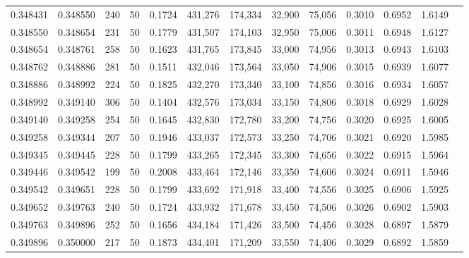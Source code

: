 \begin{tabular}{rrrrrrrrrrrrr}
0.348431 & 0.348550 &   240 &  50 &                                     0.1724 & 431,276 & 174,334 &  32,900 &  75,056 & 0.3010 & 0.6952 & 1.6149 \\
0.348550 & 0.348654 &   231 &  50 &                                     0.1779 & 431,507 & 174,103 &  32,950 &  75,006 & 0.3011 & 0.6948 & 1.6127 \\
0.348654 & 0.348761 &   258 &  50 &                                     0.1623 & 431,765 & 173,845 &  33,000 &  74,956 & 0.3013 & 0.6943 & 1.6103 \\
0.348762 & 0.348886 &   281 &  50 &                                     0.1511 & 432,046 & 173,564 &  33,050 &  74,906 & 0.3015 & 0.6939 & 1.6077 \\
0.348886 & 0.348992 &   224 &  50 &                                     0.1825 & 432,270 & 173,340 &  33,100 &  74,856 & 0.3016 & 0.6934 & 1.6057 \\
0.348992 & 0.349140 &   306 &  50 &                                     0.1404 & 432,576 & 173,034 &  33,150 &  74,806 & 0.3018 & 0.6929 & 1.6028 \\
0.349140 & 0.349258 &   254 &  50 &                                     0.1645 & 432,830 & 172,780 &  33,200 &  74,756 & 0.3020 & 0.6925 & 1.6005 \\
0.349258 & 0.349344 &   207 &  50 &                                     0.1946 & 433,037 & 172,573 &  33,250 &  74,706 & 0.3021 & 0.6920 & 1.5985 \\
0.349345 & 0.349445 &   228 &  50 &                                     0.1799 & 433,265 & 172,345 &  33,300 &  74,656 & 0.3022 & 0.6915 & 1.5964 \\
0.349446 & 0.349542 &   199 &  50 &                                     0.2008 & 433,464 & 172,146 &  33,350 &  74,606 & 0.3024 & 0.6911 & 1.5946 \\
0.349542 & 0.349651 &   228 &  50 &                                     0.1799 & 433,692 & 171,918 &  33,400 &  74,556 & 0.3025 & 0.6906 & 1.5925 \\
0.349652 & 0.349763 &   240 &  50 &                                     0.1724 & 433,932 & 171,678 &  33,450 &  74,506 & 0.3026 & 0.6902 & 1.5903 \\
0.349763 & 0.349896 &   252 &  50 &                                     0.1656 & 434,184 & 171,426 &  33,500 &  74,456 & 0.3028 & 0.6897 & 1.5879 \\
0.349896 & 0.350000 &   217 &  50 &                                     0.1873 & 434,401 & 171,209 &  33,550 &  74,406 & 0.3029 & 0.6892 & 1.5859 \\

\end{tabular}
